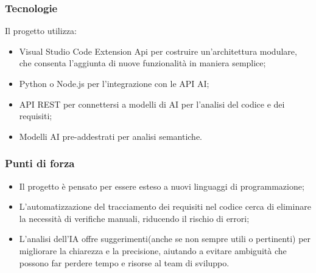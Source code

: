     \subsubsection{Tecnologie}
    Il progetto utilizza:

\begin{itemize}
    \item Visual Studio Code Extension Api per costruire un'architettura modulare, che consenta l'aggiunta di
nuove funzionalità in maniera semplice;
    \item Python o Node.js per l'integrazione con le API AI;
    \item API REST per connettersi a modelli di AI per l'analisi del codice e dei requisiti;
    \item Modelli AI pre-addestrati per analisi semantiche.
\end{itemize}
    \subsubsection{Punti di forza}
   \begin{itemize}
    \item Il progetto è pensato per essere esteso a nuovi linguaggi di programmazione;
    \item L’automatizzazione del tracciamento dei requisiti nel codice cerca di eliminare la necessità di verifiche manuali, riducendo il rischio di errori;
    \item L’analisi dell’IA offre suggerimenti(anche se non sempre utili o pertinenti) per migliorare la chiarezza e la precisione, aiutando a evitare ambiguità che possono far perdere tempo e risorse al team di sviluppo.
\end{itemize}
